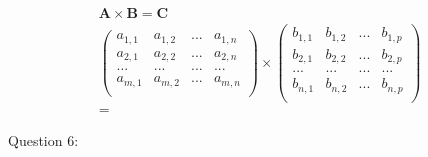 \documentclass{article}
\begin{document}
\begin{align}
    \mathbf{A} \times \mathbf{B} = \mathbf{C} \\
    \begin{pmatrix}
        a_{1,1} & a_{1,2} & ... & a_{1,n} \\
        a_{2,1} & a_{2,2} & ... & a_{2,n} \\
        ...     & ...     & ... & ...     \\
        a_{m,1} & a_{m,2} & ... & a_{m,n} \\
    \end{pmatrix}
    \times
    \begin{pmatrix}
        b_{1,1} & b_{1,2} & ... & b_{1,p} \\
        b_{2,1} & b_{2,2} & ... & b_{2,p} \\
        ...     & ...     & ... & ...     \\
        b_{n,1} & b_{n,2} & ... & b_{n,p} \\
    \end{pmatrix}         \\
    =
\end{align}

Question 6:
\end{document}
